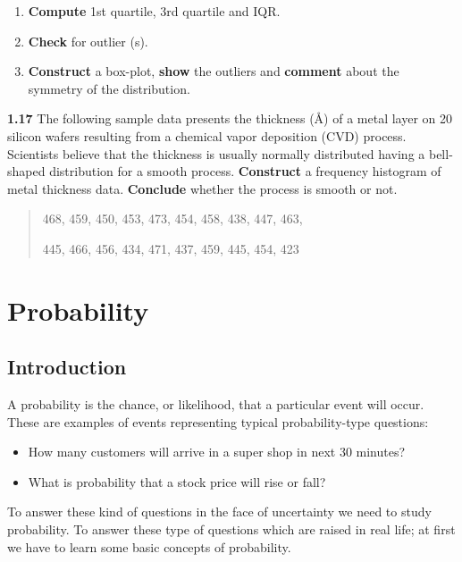 \documentclass[
  11pt,
  letterpaper,
  DIV=11,
  numbers=noendperiod]{scrreprt}
\begin{document}
\begin{enumerate}
\def\labelenumi{\roman{enumi})}
\item
  \textbf{Compute} 1st quartile, 3rd quartile and IQR.
\item
  \textbf{Check} for outlier (s).
\item
  \textbf{Construct} a box-plot, \textbf{show} the outliers and
  \textbf{comment} about the symmetry of the distribution.
\end{enumerate}

\textbf{1.17} The following sample data presents the thickness (Å) of a
metal layer on 20 silicon wafers resulting from a chemical vapor
deposition (CVD) process. Scientists believe that the thickness is
usually normally distributed having a bell-shaped distribution for a
smooth process. \textbf{Construct} a frequency histogram of metal
thickness data. \textbf{Conclude} whether the process is smooth or not.

\begin{quote}
468, 459, 450, 453, 473, 454, 458, 438, 447, 463,

445, 466, 456, 434, 471, 437, 459, 445, 454, 423
\end{quote}


\chapter{Probability}\label{probability}

\section{Introduction}\label{introduction}

A probability is the chance, or likelihood, that a particular event will
occur. These are examples of events representing typical
probability-type questions:

\begin{itemize}
\item
  How many customers will arrive in a super shop in next 30 minutes?
\item
  What is probability that a stock price will rise or fall?
\end{itemize}

To answer these kind of questions in the face of uncertainty we need to
study probability. To answer these type of questions which are raised in
real life; at first we have to learn some basic concepts of probability.
\end{document}
